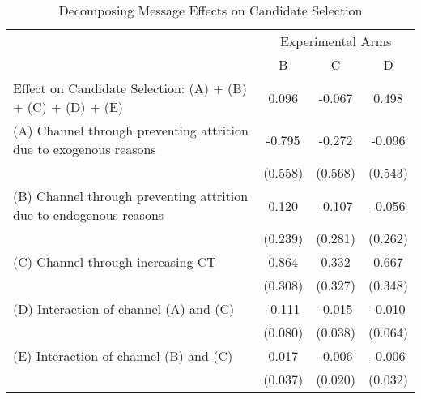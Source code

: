 \documentclass[12pt, a4paper]{article}
\begin{document}
\begin{table}[H]

\caption{\label{tab:decompose-candidate}Decomposing Message Effects on Candidate Selection}
\centering
\fontsize{8}{10}\selectfont
\begin{threeparttable}
\begin{tabular}[t]{lccc}
\toprule
\multicolumn{1}{c}{ } & \multicolumn{3}{c}{Experimental Arms} \\
\cmidrule(l{3pt}r{3pt}){2-4}
 & B & C & D\\
\midrule
Effect on Candidate Selection: (A) + (B) + (C) + (D) + (E) & 0.096 & -0.067 & 0.498\\
(A) Channel through preventing attrition due to exogenous reasons & -0.795 & -0.272 & -0.096\\
 & (0.558) & (0.568) & (0.543)\\
(B) Channel through preventing attrition due to endogenous reasons & 0.120 & -0.107 & -0.056\\
 & (0.239) & (0.281) & (0.262)\\
(C) Channel through increasing CT & 0.864 & 0.332 & 0.667\\
 & (0.308) & (0.327) & (0.348)\\
(D) Interaction of channel (A) and (C) & -0.111 & -0.015 & -0.010\\
 & (0.080) & (0.038) & (0.064)\\
(E) Interaction of channel (B) and (C) & 0.017 & -0.006 & -0.006\\
 & (0.037) & (0.020) & (0.032)\\
\bottomrule
\end{tabular}
\begin{tablenotes}
\item 
\end{tablenotes}
\end{threeparttable}
\end{table}

\clearpage


\end{document}
